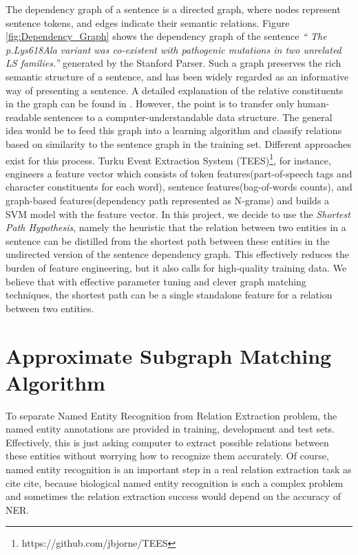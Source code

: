 The dependency graph of a sentence is a directed graph, where nodes represent sentence tokens, and edges indicate their semantic relations. Figure \ref{fig:Dependency_Graph} shows the dependency graph of the sentence \emph{`` The p.Lys618Ala variant was co-existent with pathogenic mutations in two unrelated LS families.''} generated by the Stanford Parser. Such a graph preserves the rich semantic structure of a sentence, and has been widely regarded as an informative way of presenting a sentence. A detailed explanation of the relative constituents in the graph can be found in \cite{de2008stanford}. However, the point is to transfer only human-readable sentences to a computer-understandable data structure. The general idea would be to feed this graph into a learning algorithm and classify relations based on similarity to the sentence graph in the training set. Different approaches exist for this process. Turku Event Extraction System (TEES)\footnote{https://github.com/jbjorne/TEES}, for instance, engineers a feature vector which consists of token features(part-of-speech tags and character constituents for each word), sentence features(bag-of-words counts), and graph-based features(dependency path represented as N-grams) and builds a SVM model with the feature vector\cite{bjorne2011generalizing}. In this project, we decide to use the \emph{Shortest Path Hypothesis}\cite{bunescu2005shortest}, namely the heuristic that the relation between two entities in a sentence can be distilled from the shortest path between these entities in the undirected version of the sentence dependency graph. This effectively reduces the burden of feature engineering\cite{liu2013approximate}, but it also calls for high-quality training data. We believe that with effective parameter tuning and clever graph matching techniques, the shortest path can be a single standalone feature for a relation between two entities.
\section{Approximate Subgraph Matching Algorithm}



To separate Named Entity Recognition from Relation Extraction problem, the named entity annotations are provided in training, development and test sets. Effectively, this is just asking computer to extract possible relations between these entities without worrying how to recognize them accurately. Of course, named entity recognition is an important step in a real relation extraction task as cite cite, because biological named entity recognition is such a complex problem and sometimes the relation extraction success would depend on the accuracy of NER.

